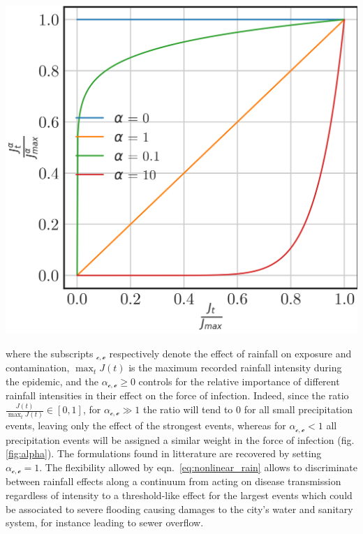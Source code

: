 \begin{marginfigure}
	\centering
	\includegraphics{fig_cholera-rainfall/alpha.png}
	\label{fig:alpha}
\end{marginfigure}
where the subscripts $_\mathcal{c,e}$ respectively denote the effect of rainfall on exposure and contamination, $\max_t J(t)$ is the maximum recorded rainfall intensity during the epidemic, and the $\alpha_{\mathcal{c,e}}\ge0$ controls for the relative importance of different rainfall intensities in their effect on the force of infection. Indeed, since the ratio $\frac{J(t)}{\max_t J(t)} \in [0,1]$, for $\alpha_{\mathcal{c,e}} \gg 1$ the ratio will tend to $0$ for all small precipitation events, leaving only the effect of the strongest events, whereas for $\alpha_{\mathcal{c,e}} < 1$ all precipitation events will be assigned a similar weight in the force of infection (fig. \ref{fig:alpha}). The formulations found in litterature are recovered by setting $\alpha_{\mathcal{c,e}} = 1$. The flexibility allowed by eqn.~\eqref{eq:nonlinear_rain} allows to discriminate between rainfall effects along a continuum from acting on disease transmission regardless of intensity to a threshold-like effect for the largest events which could be associated to severe flooding causing damages to the city's water and sanitary system, for instance leading to sewer overflow.

